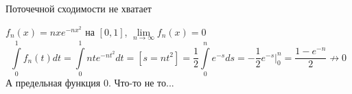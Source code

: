 \begin{remark} \thmslashn
  
  Поточечной сходимости не хватает
  
\begin{example}
   
   $f_n(x) = nxe^{-nx^2}$ на $[0, 1]$, $\lim\limits_{n\to \infty} f_n(x) = 0$
   \[\int\limits_0^1 f_n(t) dt = \int\limits_0^1 nte^{-nt^2} dt = [s = nt^2] = \frac{1}{2} \int\limits_0^n e^{-s} ds = -\frac{1}{2}e^{-s} |^n_0 = \frac{1 - e^{-n}}{2} \nrightarrow 0\] А предельная функция 0. Что-то не то...
\end{example}

\end{remark}